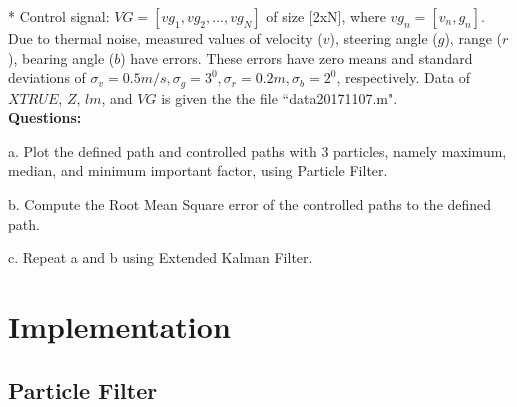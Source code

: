 \documentclass{article}
\begin{document}
* Control signal: $VG = [vg_1, vg_2, ..., vg_N]$ of size [2xN], where $vg_n = [v_n, g_n]$.\\

Due to thermal noise, measured values of velocity ($v$), steering angle ($g$), range ($r$), bearing angle ($b$) have errors. These errors have zero means and standard deviations of $\sigma_v=0.5m/s, \sigma_g=3^0, \sigma_r=0.2m, \sigma_b=2^0$, respectively. Data of $XTRUE$, $Z$, $lm$, and $VG$ is given the the file ``data20171107.m".\\

\textbf{Questions:}

a. Plot the defined path and controlled paths with 3 particles, namely maximum, median, and minimum important factor, using Particle Filter.

b. Compute the Root Mean Square error of the controlled paths to the defined path.

c. Repeat a and b using Extended Kalman Filter.


\pagebreak
\section{Implementation}

\subsection{Particle Filter}
\end{document}
